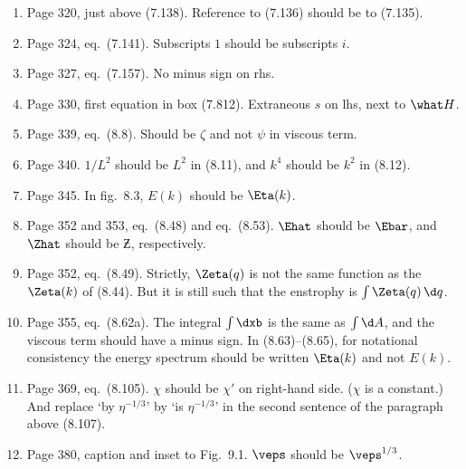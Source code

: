 \documentclass[10pt]{article}
\newcommand{\eq}{eq.\ } \newcommand{\Eq}{Eq.\ }
\begin{document}
\begin{enumerate}
\item Page 320, just above (7.138). Reference to (7.136) should be to (7.135).

\item Page 324, \eq (7.141). Subscripts $1$ should be subscripts $i$. 


\item Page 327, \eq (7.157). No minus sign on rhs.

\item Page 330, first equation in box (7.812). Extraneous $s$ on lhs, next to $\what H$.

\item Page 339, \eq (8.8). Should be $\zeta$ and not $\psi$ in viscous term. 


\item Page 340. $1/L^2$ should be $L^2$ in (8.11), and $k^4$ should be $k^2$ in (8.12).

\item Page 345. In fig.\ 8.3, $E(k)$ should be $\Eta(k)$.

\item Page 352 and 353, \eq (8.48) and \eq (8.53). $\Ehat$ should be $\Ebar$, and $\Zhat$ should be $\Zbar$, respectively.

\item Page 352, \eq (8.49). Strictly, $\Zeta(q)$ is not the same function as the $\Zeta(k)$ of (8.44). But it is still such that the enstrophy is $\int \Zeta(q) \, \d q$. 

\item Page 355, \eq (8.62a). The integral $\int \dxb$ is the same as $\int \d A$, and the viscous term should have a minus sign. In (8.63)--(8.65), for notational consistency the energy spectrum should be written $\Eta(k)$ and not $E(k)$.

\item Page 369, \eq (8.105). $\chi$ should be $\chi'$ on right-hand side. ($\chi$ is a constant.) And replace `by $\eta^{-1/3}$' by `is $\eta^{-1/3}$' in
the second sentence of the paragraph above (8.107). 

\item Page 380, caption and inset to Fig.\ 9.1. $\veps$ should be $\veps^{1/3}$. 


\end{enumerate}
\end{document}
